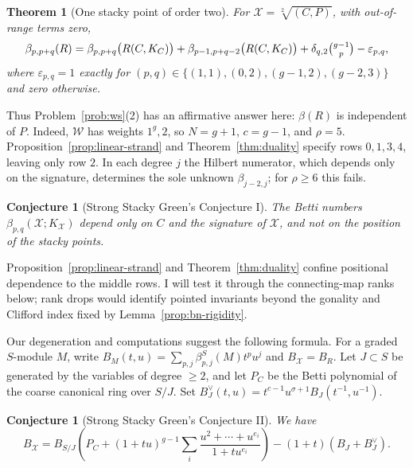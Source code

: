 \documentclass[11pt,reqno]{amsart}
\newtheorem{theorem}[lemma]{Theorem}
\newtheorem{conjecture}[lemma]{Conjecture}
\theoremstyle{remark}
\newcommand{\cW}{\mathcal{W}}
\newcommand{\cX}{\mathcal{X}}
\begin{document}
\begin{theorem}[One stacky point of order two]\label{thm:order-two}
For $\cX=\sqrt[2]{(C,P)}$, with out-of-range terms zero,
\[
\beta_{p,p+q}(R)
=\beta_{p,p+q}\big(R(C,K_C)\big)
+\beta_{p-1,p+q-2}\big(R(C,K_C)\big)
+\delta_{q,2}\tbinom{g-1}{p}
-\varepsilon_{p,q},
\]
where $\varepsilon_{p,q}=1$ exactly for
$(p,q)\in\{(1,1),(0,2),(g-1,2),(g-2,3)\}$ and zero otherwise.
\end{theorem}

Thus Problem~\ref{prob:ws}(2) has an affirmative answer here: $\beta(R)$ is independent of $P$. Indeed, $\cW$ has weights $1^g,2$, so $N=g+1$, $c=g-1$, and $\rho=5$. Proposition~\ref{prop:linear-strand} and Theorem~\ref{thm:duality} specify rows $0,1,3,4$, leaving only row $2$. In each degree $j$ the Hilbert numerator, which depends only on the signature, determines the sole unknown $\beta_{j-2,j}$; for $\rho\geq6$ this fails.
 
\begin{conjecture}[Strong Stacky Green's Conjecture I]\label{conj:middle-I}
The Betti numbers $\beta_{p,q}(\cX;K_{\cX})$ depend only on $C$ and the signature of $\cX$, and not on the position of the stacky points.
\end{conjecture}

Proposition~\ref{prop:linear-strand} and Theorem~\ref{thm:duality} confine positional dependence to the middle rows. I will test it through the connecting-map ranks below; rank drops would identify pointed invariants beyond the gonality and Clifford index fixed by Lemma~\ref{prop:bn-rigidity}.



Our degeneration and computations suggest the following formula. For a graded $S$-module $M$, write $B_M(t,u)=\sum_{p,j}\beta^S_{p,j}(M)t^pu^j$ and $B_{\cX}=B_R$. Let $J\subset S$ be generated by the variables of degree $\geq2$, and let $P_C$ be the Betti polynomial of the coarse canonical ring over $S/J$.  Set $B_J^\vee(t,u)=t^{c-1}u^{\sigma+1}B_J(t^{-1},u^{-1})$.

\begin{conjecture}[Strong Stacky Green's Conjecture II]\label{conj:middle}
We have
\[
B_\cX
=B_{S/J}\left(
P_C+(1+tu)^{g-1}
\sum_i\frac{u^2+\cdots+u^{e_i}}{1+tu^{e_i}}
\right)-(1+t)(B_J+B_J^\vee).
\]
\end{conjecture}
\end{document}

